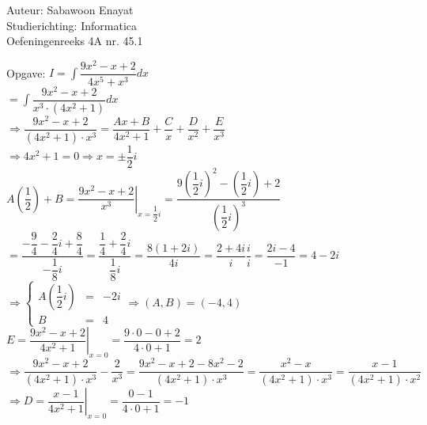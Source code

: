 \documentclass[a4paper]{article}
\begin{document}
  
\noindent \large Auteur: Sabawoon Enayat \\
\noindent \large Studierichting: Informatica\\
\noindent \large Oefeningenreeks 4A nr. 45.1 \\

\newcommand{\dint}{\displaystyle\int}
\newcommand{\Bgtan}{\operatorname{Bgtan}}

\medskip

\normalsize

Opgave: $I = \dint \dfrac{9x^2 - x + 2}{4x^5 + x^3} dx$\\

$= \dint \dfrac{9x^2 - x + 2}{x^3 \cdot (4x^2 + 1)} dx$\\

$\Rightarrow \dfrac{9x^2 - x + 2}{(4x^2 + 1) \cdot x^3} = \dfrac{Ax + B}{4x^2 + 1} + \dfrac{C}{x} + \dfrac{D}{x^2} + \dfrac{E}{x^3}$\\

$\Rightarrow 4x^2 + 1 = 0 \Rightarrow x = \pm \dfrac{1}{2}i$\\

$A\left(\dfrac{1}{2}\right) + B = \left. \dfrac{9x^2 - x + 2}{x^3} \right|_{x=\dfrac{1}{2}i} = \dfrac{9\left(\dfrac{1}{2}i\right)^2 - \left(\dfrac{1}{2}i\right) + 2}{\left(\dfrac{1}{2}i\right)^3}$\\

$= \dfrac{-\dfrac{9}{4} - \dfrac{2}{4}i + \dfrac{8}{4}}{-\dfrac{1}{8}i} = \dfrac{\dfrac{1}{4} + \dfrac{2}{4}i}{\dfrac{1}{8}i} = \dfrac{8(1 + 2i)}{4i} = \dfrac{2 + 4i}{i} \dfrac{i}{i} = \dfrac{2i - 4}{-1} = 4 - 2i$\\

$\Rightarrow \left\{
	\begin{array}{lcr}
		A\left(\dfrac{1}{2}i\right) & = & -2i \\
		B & = & 4
	\end{array}
\right. \Rightarrow (A, B) = (-4, 4)$\\

$E = \left. \dfrac{9x^2 - x + 2}{4x^2 + 1} \right|_{x = 0} = \dfrac{9\cdot 0 - 0 + 2}{4 \cdot 0 + 1} = 2$\\

${\Rightarrow} \dfrac{9x^2 - x + 2}{(4x^2 + 1) \cdot x^3} - \dfrac{2}{x^3} = \dfrac{9x^2 - x + 2 - 8x^2 - 2}{(4x^2 + 1) \cdot x^3} = \dfrac{x^2 - x}{(4x^2 + 1) \cdot x^3} = \dfrac{x - 1}{(4x^2 + 1) \cdot x^2}$\\

$\Rightarrow D = \left. \dfrac{x - 1}{4x^2 + 1} \right|_{x=0} = \dfrac{0 - 1}{4 \cdot 0 + 1} = -1$\\
\end{document}

